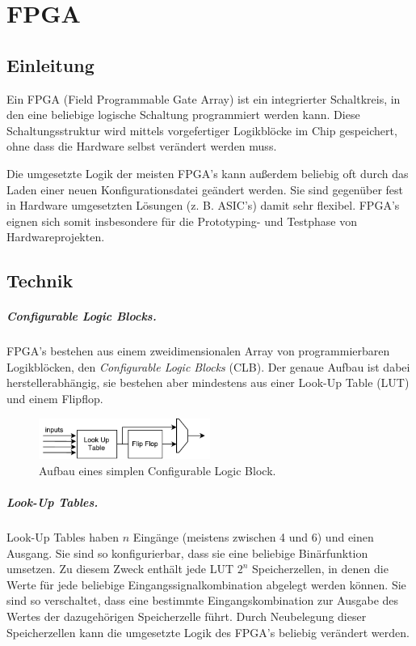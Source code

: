\chapter{FPGA} %
\label{FPGA} %

\section{Einleitung}
Ein FPGA (Field Programmable Gate Array) ist ein integrierter Schaltkreis, in den eine beliebige logische Schaltung programmiert werden kann. Diese Schaltungsstruktur wird mittels vorgefertiger Logikblöcke im Chip gespeichert, ohne dass die Hardware selbst verändert werden muss.

Die umgesetzte Logik der meisten FPGA's kann außerdem beliebig oft durch das Laden einer neuen Konfigurationsdatei geändert werden. Sie sind gegenüber fest in Hardware umgesetzten Lösungen (z. B. ASIC's) damit sehr flexibel. FPGA's eignen sich somit insbesondere für die Prototyping- und Testphase von Hardwareprojekten. \cite[S. 8]{SynthesisFPGA}

\section{Technik}
\paragraph{Configurable Logic Blocks.} FPGA's bestehen aus einem zweidimensionalen Array von programmierbaren Logikblöcken, den \emph{Configurable Logic Blocks} (CLB). \cite[S. 11]{Chu} Der genaue Aufbau ist dabei herstellerabhängig, sie bestehen aber mindestens aus einer Look-Up Table (LUT) und einem Flipflop. \cite[S. 8]{SynthesisFPGA}

\begin{figure} [ht]
  \centering
  \includegraphics[width=0.5\textwidth]{Figures/clb}
  \caption{Aufbau eines simplen Configurable Logic Block.}
  \label{fig:clb}
\end{figure}

\paragraph{Look-Up Tables.} Look-Up Tables haben $n$ Eingänge (meistens zwischen 4 und 6) und einen Ausgang. Sie sind so konfigurierbar, dass sie eine beliebige Binärfunktion umsetzen. Zu diesem Zweck enthält jede LUT $2^n$ Speicherzellen, in denen die Werte für jede beliebige Eingangssignalkombination abgelegt werden können. Sie sind so verschaltet, dass eine bestimmte Eingangskombination zur Ausgabe des Wertes der dazugehörigen Speicherzelle führt. \cite[S. 12f.]{Chu} Durch Neubelegung dieser Speicherzellen kann die umgesetzte Logik des FPGA's beliebig verändert werden.

